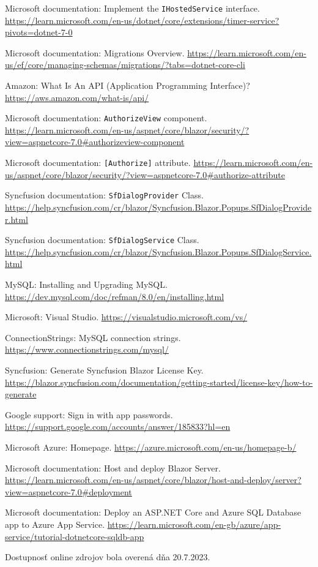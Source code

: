 \begin{thebibliography}{99}
Microsoft documentation: Implement the \verb|IHostedService| interface.
\url{https://learn.microsoft.com/en-us/dotnet/core/extensions/timer-service?pivots=dotnet-7-0}

Microsoft documentation: Migrations Overview.
\url{https://learn.microsoft.com/en-us/ef/core/managing-schemas/migrations/?tabs=dotnet-core-cli}

Amazon: What Is An API (Application Programming Interface)?
\url{https://aws.amazon.com/what-is/api/}

Microsoft documentation: \verb|AuthorizeView| component.
\url{https://learn.microsoft.com/en-us/aspnet/core/blazor/security/?view=aspnetcore-7.0\#authorizeview-component}

Microsoft documentation: \verb|[Authorize]| attribute.
\url{https://learn.microsoft.com/en-us/aspnet/core/blazor/security/?view=aspnetcore-7.0\#authorize-attribute}

Syncfusion documentation: \verb|SfDialogProvider| Class.
\url{https://help.syncfusion.com/cr/blazor/Syncfusion.Blazor.Popups.SfDialogProvider.html}

Syncfusion documentation: \verb|SfDialogService| Class.
\url{https://help.syncfusion.com/cr/blazor/Syncfusion.Blazor.Popups.SfDialogService.html}

MySQL: Installing and Upgrading MySQL.
\url{https://dev.mysql.com/doc/refman/8.0/en/installing.html}

Microsoft: Visual Studio.
\url{https://visualstudio.microsoft.com/vs/}

ConnectionStrings: MySQL connection strings.
\url{https://www.connectionstrings.com/mysql/}

Syncfusion: Generate Syncfusion Blazor License Key.
\url{https://blazor.syncfusion.com/documentation/getting-started/license-key/how-to-generate}

Google support: Sign in with app passwords.
\url{https://support.google.com/accounts/answer/185833?hl=en}

Microsoft Azure: Homepage.
\url{https://azure.microsoft.com/en-us/homepage-b/}

Microsoft documentation: Host and deploy Blazor Server.
\url{https://learn.microsoft.com/en-us/aspnet/core/blazor/host-and-deploy/server?view=aspnetcore-7.0#deployment}

Microsoft documentation: Deploy an ASP.NET Core and Azure SQL Database app to Azure App Service.
\url{https://learn.microsoft.com/en-gb/azure/app-service/tutorial-dotnetcore-sqldb-app}
\end{thebibliography}

\hspace{1cm}

Dostupnosť online zdrojov bola overená dňa 20.7.2023.
